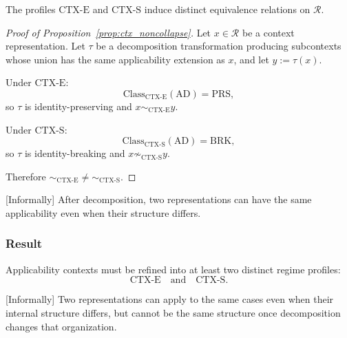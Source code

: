 \begin{proposition}
\label{prop:ctx_noncollapse}
The profiles $\mathrm{CTX\mbox{-}E}$ and $\mathrm{CTX\mbox{-}S}$ induce
distinct equivalence relations on $\mathcal{R}$.
\end{proposition}

\begin{proof}[Proof of Proposition~\ref{prop:ctx_noncollapse}]
Let $x \in \mathcal{R}$ be a context representation.
Let $\tau$ be a decomposition transformation producing subcontexts
whose union has the same applicability extension as $x$,
and let $y := \tau(x)$.

Under $\mathrm{CTX\mbox{-}E}$:
\[
\mathrm{Class}_{\mathrm{CTX\mbox{-}E}}(\mathrm{AD}) = \mathrm{PRS},
\]
so $\tau$ is identity-preserving and $x \sim_{\mathrm{CTX\mbox{-}E}} y$.

Under $\mathrm{CTX\mbox{-}S}$:
\[
\mathrm{Class}_{\mathrm{CTX\mbox{-}S}}(\mathrm{AD}) = \mathrm{BRK},
\]
so $\tau$ is identity-breaking and $x \not\sim_{\mathrm{CTX\mbox{-}S}} y$.

Therefore $\sim_{\mathrm{CTX\mbox{-}E}} \neq \sim_{\mathrm{CTX\mbox{-}S}}$.
\end{proof}

[Informally]
After decomposition, two representations can have the same applicability
even when their structure differs.


\subsubsection{Result}

\begin{theorem}
Applicability contexts must be refined into at least two distinct regime profiles:
\[
\mathrm{CTX\mbox{-}E}
\quad\text{and}\quad
\mathrm{CTX\mbox{-}S}.
\]
\end{theorem}

[Informally]
Two representations can apply to the same cases even when their internal structure differs,
but cannot be the same structure once decomposition changes that organization.

